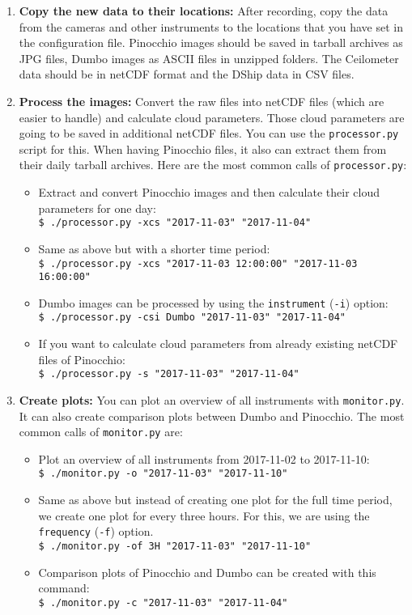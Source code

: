 \documentclass[11pt,a4paper]{article}
\begin{document}
\begin{enumerate}
	\item \textbf{Copy the new data to their locations:} After recording, copy the data from the cameras and other instruments to the locations that you have set in the configuration file. Pinocchio images should be saved in tarball archives as JPG files, Dumbo images as ASCII files in unzipped folders. The Ceilometer data should be in netCDF format and the DShip data in CSV files.
	\item \textbf{Process the images:} Convert the raw files into netCDF files (which are easier to handle) and calculate cloud parameters. Those cloud parameters are going to be saved in additional netCDF files. You can use the \texttt{processor.py} script for this. When having Pinocchio files, it also can extract them from their daily tarball archives. Here are the most common calls of \texttt{processor.py}:
	\begin{itemize}
		\item Extract and convert Pinocchio images and then calculate their cloud parameters for one day:\\
		\texttt{\$ ./processor.py -xcs "2017-11-03" "2017-11-04" }
		\item Same as above but with a shorter time period:\\
		\texttt{\$ ./processor.py -xcs "2017-11-03 12:00:00" "2017-11-03 16:00:00" }
		\item Dumbo images can be processed by using the \texttt{instrument} (\texttt{-i}) option:\\
		\texttt{\$ ./processor.py -csi Dumbo "2017-11-03" "2017-11-04" }
		\item If you want to calculate cloud parameters from already existing netCDF files of Pinocchio: \\
		\texttt{\$ ./processor.py -s "2017-11-03" "2017-11-04" }
	\end{itemize}
	\item \textbf{Create plots:}  You can plot an overview of all instruments with \texttt{monitor.py}. It can also create comparison plots between Dumbo and Pinocchio. The most common calls of \texttt{monitor.py} are:
	\begin{itemize}
		\item Plot an overview of all instruments from 2017-11-02 to 2017-11-10:\\
		\texttt{\$ ./monitor.py -o "2017-11-03" "2017-11-10" }
		\item Same as above but instead of creating one plot for the full time period, we create one plot for every three hours. For this, we are using the \texttt{frequency} (\texttt{-f}) option.\\
		\texttt{\$ ./monitor.py -of 3H "2017-11-03" "2017-11-10"}
		\item Comparison plots of Pinocchio and Dumbo can be created with this command:\\
		\texttt{\$ ./monitor.py -c "2017-11-03" "2017-11-04" }
	\end{itemize}

\end{enumerate}
\end{document}

